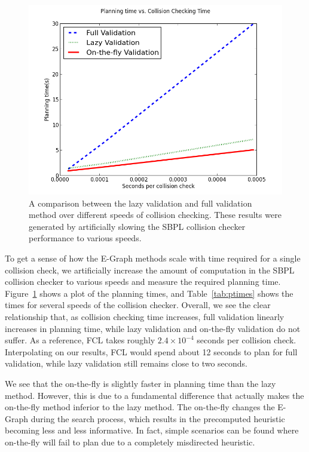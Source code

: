 \documentclass[letterpaper, 10 pt, conference]{ieeeconf}  %
\newcommand{\tabref}[1]{Table~\ref{tab:#1}}
\newcommand{\figref}[1]{Figure~\ref{fig:#1}}
\newcommand{\figlab}[1]{\label{fig:#1}}
\begin{document}
\begin{figure}[ht]
    \includegraphics[width=1\columnwidth]{full_lazy_onthefly2.png}
    \caption{A comparison between the lazy validation and full validation method
    over different speeds of collision checking. These results were generated by
artificially slowing the SBPL collision checker performance to various speeds. }
    \figlab{cccompare}
\end{figure}

To get a sense of how the E-Graph methods scale with time required for a single
collision check, we artificially increase the amount of computation in the SBPL
collision checker \cite{cohen2013single} to various speeds and measure the required planning time.
\figref{cccompare} shows a plot of the planning times, and \tabref{ptimes} shows
the times for several speeds of the collision checker. Overall, we see the clear relationship that, as collision
checking time increases, full validation linearly increases in planning time,
while lazy validation and on-the-fly validation do not suffer.  As a reference,
FCL takes roughly $2.4\times10^{-4}$ seconds per collision check. Interpolating
on our results, FCL would spend about 12 seconds to plan for full validation,
while lazy validation still remains close to two seconds. 

We see that the on-the-fly is slightly faster in planning time than the lazy
method.  However, this is due to a fundamental difference that actually makes
the on-the-fly method inferior to the lazy method. The on-the-fly changes the
E-Graph during the search process, which results in the precomputed heuristic
becoming less and less informative. In fact, simple scenarios can be found where
on-the-fly will fail to plan due to a completely misdirected heuristic. 
\end{document}

